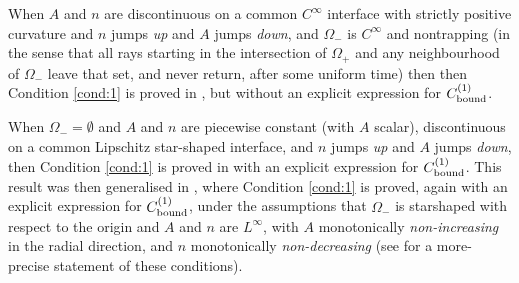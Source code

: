 \documentclass[10pt]{article}%
\newtheorem{definition}[theorem]{Definition}
\numberwithin{equation}{section}
\newcommand{\Rea}{\mathbb{R}}
\newcommand{\Oi}{{\Omega_-}}
\newcommand{\Oe}{{\Omega_+}}
\newcommand{\coeffAo}{A^{(1)}}
\newcommand{\coeffno}{n^{(1)}}
\begin{document}
When $A$ and $n$ are discontinuous on a common $C^\infty$ interface with strictly positive curvature and $n$ jumps \emph{up} and $A$ jumps \emph{down}, and $\Oi$ is 
$C^\infty$ and nontrapping (in the sense that all rays starting in the intersection of $\Oe$ and any neighbourhood of $\Oi$ leave that set, and never return, after some uniform time) then
then Condition \ref{cond:1} is proved in \cite{CaPoVo:99}, but without an explicit expression for $C^{(1)}_{\rm bound}$.

When $\Oi=\emptyset$ and $A$ and $n$ are piecewise constant (with $A$ scalar), discontinuous on a common Lipschitz star-shaped interface, and $n$ jumps \emph{up} and $A$ jumps \emph{down}, then Condition \ref{cond:1} is proved in \cite{MoSp:17} with an explicit expression for $C^{(1)}_{\rm bound}$. 
This result was then generalised in \cite[Theorem 2.7]{GrPeSp:18}, where 
Condition \ref{cond:1} is proved, again with an explicit expression for $C^{(1)}_{\rm bound}$, under the assumptions that $\Oi$ is starshaped with respect to the origin and $A$ and $n$ are $L^\infty$, with $A$ monotonically \emph{non-increasing} in the radial direction, and $n$ monotonically \emph{non-decreasing} (see \cite[Condition 2.6]{GrPeSp:18} for a more-precise statement of these conditions).









\end{document}
